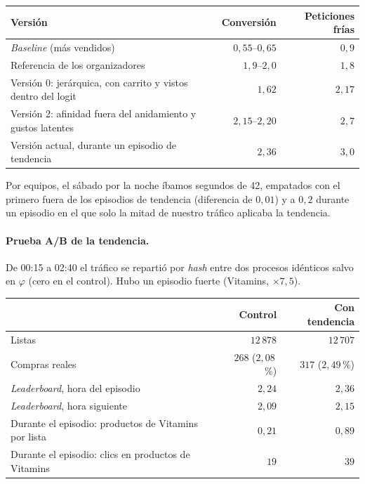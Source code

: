 \documentclass[11pt,a4paper]{article}
\begin{document}
\begin{center}
\small
\begin{tabular}{p{8.6cm}rr}
\toprule
Versión & Conversión & Peticiones frías\\
\midrule
\emph{Baseline} (más vendidos) & $0{,}55$--$0{,}65$ & $0{,}9$\\
Referencia de los organizadores & $1{,}9$--$2{,}0$ & $1{,}8$\\
Versión 0: jerárquica, con carrito y vistos dentro del logit & $1{,}62$ & $2{,}17$\\
Versión 2: afinidad fuera del anidamiento y gustos latentes & $2{,}15$--$2{,}20$ & $2{,}7$\\
Versión actual, durante un episodio de tendencia & $2{,}36$ & $3{,}0$\\
\bottomrule
\end{tabular}
\end{center}

Por equipos, el sábado por la noche íbamos segundos de 42, empatados con el primero fuera de los episodios
de tendencia (diferencia de $0{,}01$) y a $0{,}2$ durante un episodio en el que solo la mitad de nuestro
tráfico aplicaba la tendencia.

\paragraph{Prueba A/B de la tendencia.} De 00:15 a 02:40 el tráfico se repartió por \emph{hash} entre dos
procesos idénticos salvo en $\varphi$ (cero en el control). Hubo un episodio fuerte (Vitamins, $\times7{,}5$).

\begin{center}
\small
\begin{tabular}{lrr}
\toprule
 & Control & Con tendencia\\
\midrule
Listas & $12\,878$ & $12\,707$\\
Compras reales & $268$ ($2{,}08$\,\%) & $317$ ($2{,}49$\,\%)\\
\emph{Leaderboard}, hora del episodio & $2{,}24$ & $2{,}36$\\
\emph{Leaderboard}, hora siguiente & $2{,}09$ & $2{,}15$\\
Durante el episodio: productos de Vitamins por lista & $0{,}21$ & $0{,}89$\\
Durante el episodio: clics en productos de Vitamins & $19$ & $39$\\
\bottomrule
\end{tabular}
\end{center}
\end{document}
